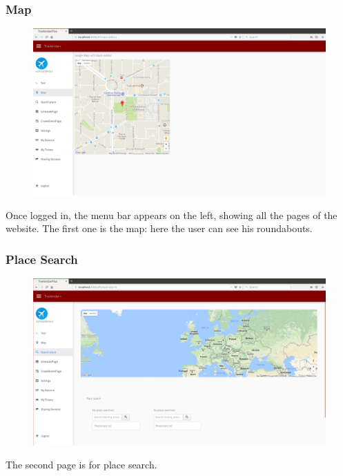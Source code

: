 \documentclass{article}
\begin{document}
			\subsubsection{Map}
			\begin{figure}[H]
			\includegraphics[width=\linewidth]{Images/Pages/2-Map.png}
			\label{fig:Map}
			\end{figure}
		Once logged in, the menu bar appears on the left, showing all the pages of the website. The first one is the map: here the user can see his roundabouts.
			\subsubsection{Place Search}
			\begin{figure}[H]
			\includegraphics[width=\linewidth]{Images/Pages/3-Map.png}
			\label{fig:Map2}
			\end{figure}
		The second page is for place search.
\end{document}
